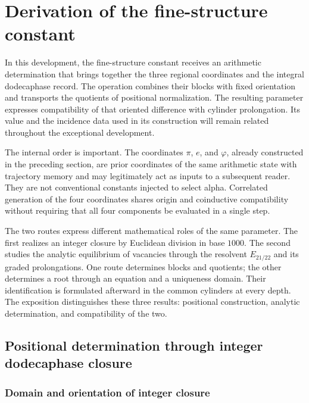 \section{Derivation of the fine-structure constant}
\label{sec:alpha}

In this development, the fine-structure constant receives an arithmetic
determination that brings together the three regional coordinates and the integral
dodecaphase record. The operation combines their blocks with fixed orientation and
transports the quotients of positional normalization. The resulting
parameter expresses compatibility of that oriented difference with
cylinder prolongation. Its value and the incidence data
used in its construction will remain related throughout the
exceptional development.

The internal order is important. The coordinates \(\pi\),
\(e\), and \(\varphi\), already constructed in the preceding section, are prior
coordinates of the same arithmetic state with trajectory memory and may legitimately act as
inputs to a subsequent reader. They are not conventional constants
injected to select alpha. Correlated generation of the four coordinates shares origin and
coinductive compatibility without requiring that all four
components be evaluated in a single step.

The two routes express different mathematical roles of the same parameter.
The first realizes an integer closure by Euclidean division in base
\(1000\). The second studies the analytic equilibrium of vacancies through
the resolvent \(E_{21/22}\) and its graded prolongations. One route
determines blocks and quotients; the other determines a root through an
equation and a uniqueness domain. Their identification is formulated afterward
in the common cylinders at every depth. The exposition distinguishes
these three results: positional construction, analytic determination,
and compatibility of the two.

\subsection{Positional determination through integer dodecaphase closure}
\subsubsection{Domain and orientation of integer closure}
\label{subsec:alpha-dominio}

